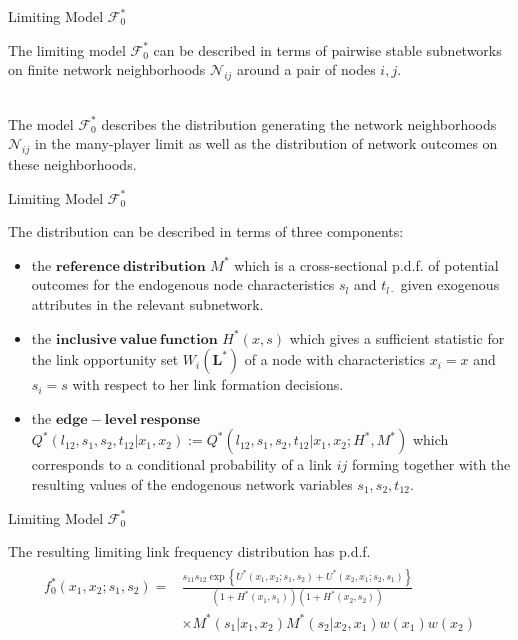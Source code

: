 \documentclass{beamer}		%
\begin{document}
\begin{frame}{Limiting Model $\mathcal{F}_0^*$}

The limiting model $\mathcal{F}_0^*$ can be described in terms of pairwise stable subnetworks on finite network neighborhoods $\mathcal{N}_{ij}$ around a pair of nodes $i, j$.

~\\
The model $\mathcal{F}_0^*$ describes the distribution generating the network neighborhoods $\mathcal{N}_{ij}$ in the many-player limit as well as the distribution of network outcomes on these neighborhoods.

\end{frame}




\begin{frame}{Limiting Model $\mathcal{F}_0^*$}

The distribution can be described in terms of three components:
\begin{itemize}
    \item the $\bm{reference\ distribution}$  $M^*$ which is a cross-sectional p.d.f. of potential outcomes for the endogenous node characteristics $s_l$ and $t_{l\cdot}$ given exogenous attributes in the relevant subnetwork.
    \item the $\bm{inclusive\ value\ function}$ $H^*(x,s)$ which gives a sufficient statistic for the link opportunity set $W_i(\bm{L}^*)$ of a node with characteristics $x_i=x$ and $s_i=s$ with respect to her link formation decisions.
    \item the $\bm{edge-level\ response}$ $Q^*(l_{12},s_1,s_2,t_{12}|x_1,x_2):=Q^*(l_{12},s_1,s_2,t_{12}|x_1,x_2;H^*,M^*)$ which corresponds to a conditional probability of a link $ij$ forming together with the resulting values of the endogenous network variables $s_1, s_2, t_{12}$.
\end{itemize}



\end{frame}









\begin{frame}{Limiting Model $\mathcal{F}_0^*$}

The resulting limiting link frequency distribution has p.d.f.
\begin{align}
\begin{split}
    f_0^*(x_1, x_2;s_1, s_2) = 
    & \frac{s_{11} s_{12} \exp \left\{ U^*(x_1, x_2; s_1, s_2) + U^*(x_2, x_1;s_2, s_1)\right\}}{(1+H^*(x_1, s_1))(1+H^*(x_2,s_2))} \\
    & \times M^*(s_1|x_1, x_2) M^*(s_2|x_2, x_1) w(x_1) w(x_2)
\end{split}
\end{align}


\end{frame}
\end{document}
